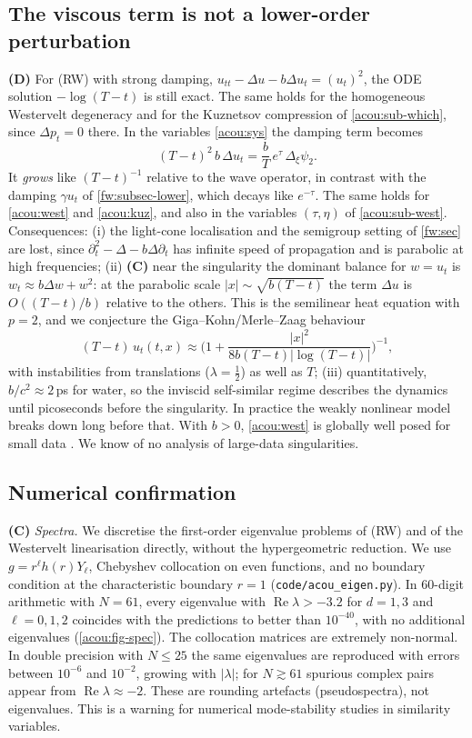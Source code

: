\subsection{The viscous term is not a lower-order perturbation}
\label{acou:sub-visc}
\textbf{(D)} For (RW) with strong damping,
$u_{tt}-\Delta u-b\Delta u_t=(u_t)^2$, the ODE solution $-\log(T-t)$ is still
exact. The same holds for the homogeneous Westervelt degeneracy and for the
Kuznetsov compression of \cref{acou:sub-which}, since $\Delta p_t=0$
there. In the variables \eqref{acou:sys} the damping term becomes
\[
  (T-t)^2\,b\,\Delta u_t=\frac bT\,e^{\tau}\,\Delta_\xi\psi_2 .
\]
It \emph{grows} like $(T-t)^{-1}$ relative to the wave operator, in
contrast with the damping $\gamma u_t$ of \cref{fw:subsec-lower}, which
decays like $e^{-\tau}$. The same holds for \eqref{acou:west} and
\eqref{acou:kuz}, and also in the variables $(\tau,\eta)$ of
\cref{acou:sub-west}. Consequences:
(i) the light-cone localisation and the semigroup setting of
\cref{fw:sec} are lost, since $\partial_t^2-\Delta-b\Delta\partial_t$ has
infinite speed of propagation and is parabolic at high frequencies;
(ii) \textbf{(C)} near the singularity the dominant balance for $w=u_t$ is
$w_t\approx b\Delta w+w^2$: at the parabolic scale $|x|\sim\sqrt{b(T-t)}$ the
term $\Delta u$ is $O((T-t)/b)$ relative to the others. This is the
semilinear heat equation with $p=2$, and we conjecture the
Giga--Kohn/Merle--Zaag behaviour \cite{GigaKohn1985,MerleZaag1997}%
\[
  (T-t)\,u_t(t,x)\approx\Big(1+\frac{|x|^2}{8b(T-t)|\log(T-t)|}\Big)^{-1},
\]
with instabilities from translations ($\lambda=\frac12$) as well as $T$;
(iii) quantitatively, $b/c^2\approx2\,$ps for water, so the inviscid
self-similar regime describes the dynamics until picoseconds before the
singularity. In practice the weakly nonlinear model breaks down long before
that. With $b>0$, \eqref{acou:west} is globally well posed for small data
\cite{KaltenbacherLasiecka2009}. We know of no analysis of large-data
singularities.

\subsection{Numerical confirmation}
\label{acou:sub-num}
\textbf{(C)} \emph{Spectra.} We discretise the first-order eigenvalue
problems of (RW) and of the Westervelt linearisation directly, without the
hypergeometric reduction. We use $g=r^\ell h(r)Y_\ell$, Chebyshev collocation
on even functions, and no boundary condition at the characteristic boundary
$r=1$ (\texttt{code/acou\_eigen.py}). In 60-digit arithmetic with $N=61$,
every eigenvalue with $\operatorname{Re}\lambda>-3.2$ for $d=1,3$ and
$\ell=0,1,2$ coincides with the predictions to better than $10^{-40}$, with
no additional eigenvalues (\cref{acou:fig-spec}). The collocation matrices
are extremely non-normal. In double precision with $N\le25$ the same eigenvalues are reproduced with
errors between $10^{-6}$ and $10^{-2}$, growing with $|\lambda|$; for
$N\gtrsim61$ spurious complex pairs appear from $\operatorname{Re}\lambda\approx-2$.
These are rounding artefacts (pseudospectra), not eigenvalues. This is a
warning for numerical mode-stability studies in similarity variables.

